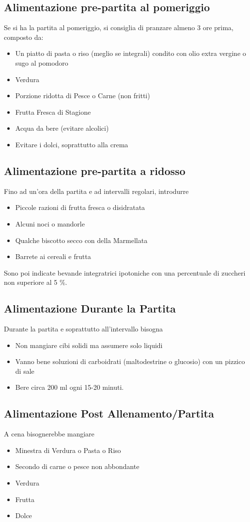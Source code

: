 \documentclass[../uefaC.tex]{subfiles}
\begin{document}
\subsection{Alimentazione pre-partita al pomeriggio}
Se si ha la partita al pomeriggio, si consiglia di pranzare almeno 3 ore prima, composto da:
\begin{itemize}
    \item Un piatto di pasta o riso (meglio se integrali) condito con olio extra vergine o sugo al pomodoro
    \item Verdura
    \item Porzione ridotta di Pesce o Carne (non fritti)
    \item Frutta Fresca di Stagione
    \item Acqua da bere (evitare alcolici)
    \item Evitare i dolci, soprattutto alla crema
\end{itemize}

\subsection{Alimentazione pre-partita a ridosso}
Fino ad un'ora della partita e ad intervalli regolari, introdurre
\begin{itemize}
    \item Piccole razioni di frutta fresca o disidratata
    \item Alcuni noci o mandorle
    \item Qualche biscotto secco con della Marmellata
    \item Barrete ai cereali e frutta
\end{itemize}
Sono poi indicate bevande integratrici ipotoniche con una percentuale di zuccheri non superiore al 5 \%.

\subsection{Alimentazione Durante la Partita}
Durante la partita e soprattutto all'intervallo bisogna
\begin{itemize}
    \item Non mangiare cibi solidi ma assumere solo liquidi
    \item Vanno bene soluzioni di carboidrati (maltodestrine o glucosio) con un pizzico di sale 
    \item Bere circa 200 ml ogni 15-20 minuti.
\end{itemize}

\subsection{Alimentazione Post Allenamento/Partita}
A cena bisognerebbe mangiare
\begin{itemize}
    \item Minestra di Verdura o Pasta o Riso
    \item Secondo di carne o pesce non abbondante
    \item Verdura
    \item Frutta
    \item Dolce
\end{itemize}
\end{document}
